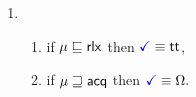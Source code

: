\begin{minipage}{1.0\linewidth}
\begin{multicols}{2}
\begin{enumerate}[topsep=0pt,label=(\textsc{r}\arabic*),ref=\textsc{r}\arabic*]
      
    \item[] 
      \begin{enumerate}[leftmargin=0pt]
      \item \label{read-term-nonempty-ca}
        if $\mu\sqsubseteq{\mathsf{rlx}}$ then $\aTerm \riff \TRUE$,
      \item \label{read-term-empty-ca}
        if $\mu\sqsupseteq{\mathsf{acq}}$ then
        \begin{math}
          \aTerm \riff
          \emptyForm.
        \end{math}
      \end{enumerate}      
    \end{enumerate}

\end{multicols}
\end{minipage}
